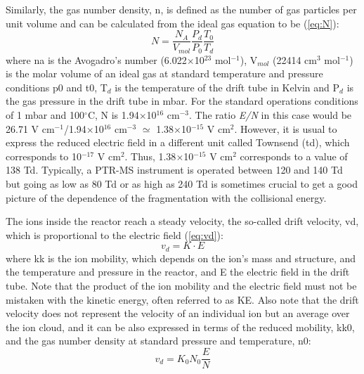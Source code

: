 Similarly, the gas number density, \acrshort{n}, is defined as the number of gas particles per unit volume and can be calculated from the ideal gas equation to be (\autoref{eq:N}):
\begin{equation}
N = \frac{N_A}{V_{mol}}\frac{P_d}{P_0}\frac{T_0}{T_d}
\label{eq:N}
\end{equation}
where \acrshort{na} is the Avogadro's number (6.022$\times$10$^{23}$ mol$^{-1}$), V$_{mol}$ (22414 cm$^{3}$ mol$^{-1}$) is the molar volume of an ideal gas at standard temperature and pressure conditions \acrshort{p0}  and \acrshort{t0}, T$_d$ is the temperature of the drift tube in Kelvin and P$_d$ is the gas pressure in the drift tube in mbar.
For the standard operations conditions of 1 mbar and 100$^{\circ}$C, N is 1.94$\times$10$^{16}$ cm$^{-3}$.
The ratio \textit{E/N} in this case would be 26.71 V cm$^{-1}$/1.94$\times$10$^{16}$ cm$^{-3}$ $\simeq$ 1.38$\times$10$^{-15}$ V cm$^{2}$.
However, it is usual to express the reduced electric field in a different unit called Townsend (\acrshort{td}), which corresponds to 10$^{-17}$ V cm$^{2}$.
Thus, 1.38$\times$10$^{-15}$ V cm$^{2}$ corresponds to a value of 138 Td.
Typically, a PTR-MS instrument is operated between 120 and 140 Td but going as low as 80 Td or as high as 240 Td is sometimes crucial to get a good picture of the dependence of the fragmentation with the collisional energy.

The ions inside the reactor reach a steady velocity, the so-called drift velocity, \acrshort{vd}, which is proportional to the electric field (\autoref{eq:vd}):
\begin{equation}
v_d = K\cdot E
\label{eq:vd}
\end{equation}
where \acrshort{kk} is the ion mobility, which depends on the ion's mass and structure, and the temperature and pressure in the reactor, and E the electric field in the drift tube.
Note that the product of the ion mobility and the electric field must not be mistaken with the kinetic energy, often referred to as KE.
Also note that the drift velocity does not represent the velocity of an individual ion but an average over the ion cloud, and it can be also  expressed in terms of the reduced mobility, \acrshort{kk0}, and the gas number density at standard pressure and temperature, \acrshort{n0}:
\begin{equation}
v_d = K_0 N_0 \frac{E}{N}
\label{eq:vd2}
\end{equation}

